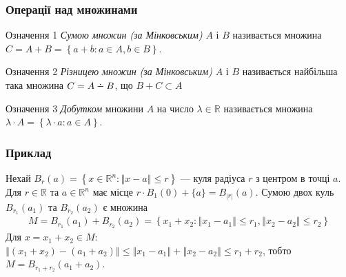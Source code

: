 \documentclass[10pt,pdf,aspectratio=169]{beamer}
\newcommand{\R}{\mathbb{R}}
\renewcommand{\l}{\left}
\renewcommand{\r}{\right}
\newcommand{\norm}[1]{\left\Vert #1 \right\Vert}
\def\setdif{\mathbin{\ooalign{\hss\raise1ex\hbox{.}\hss\cr
  \mathsurround=0pt$-$}}}
\begin{document}
    \begin{frame}
        \frametitle{Операції над множинами}
    
        \begin{block}{Означення 1}
            \emph{Сумою множин (за Мінковським)} $A$ і $B$ називається множина
            $C = A + B = \l\{ a + b : a \in A, b \in B\r\}$.
        \end{block}

        \begin{block}{Означення 2}
            \emph{Різницею множин (за Мінковським)} $A$ і $B$ називається найбільша така множина
            $C = A \setdif B$, що $B + C \subset A$
        \end{block}

        \begin{block}{Означення 3}
            \emph{Добутком} множини $A$ на число $\lambda \in \R$ називається множина
            $\lambda \cdot A = \l\{\lambda \cdot a : a \in A \r\}$.
        \end{block}
    \end{frame}
    \begin{frame}
        \frametitle{Приклад}
    
        Нехай $B_{r}(a) = \l\{x \in \R^n : \norm{x - a} \leq r \r\}$ --- куля
        радіуса $r$ з центром в точці $a$. Для
        $r \in \R$ та $a \in \R^n$ має місце
        $r\cdot B_{1}(0) + \{a\} = B_{|r|}(a)$.
        Сумою двох куль $B_{r_1}(a_1)$ та $B_{r_2}(a_2)$ є множина
        \begin{gather*}
            M = B_{r_1}(a_1) + B_{r_2}(a_2) = \l\{ 
                x_1 + x_2 : \norm{x_1 - a_1} \leq r_1, \norm{x_2 - a_2} \leq r_2    
            \r\}
        \end{gather*}
        Для $x = x_1 + x_2 \in M$: $\norm{(x_1 + x_2) - (a_1 + a_2)} \leq \norm{x_1 - a_1} + \norm{x_2 - a_2} \leq r_1 + r_2$,
        тобто $M = B_{r_1 + r_2}(a_1 + a_2)$.
        \begin{center}
        \end{center}
    
    \end{frame}
\end{document}
